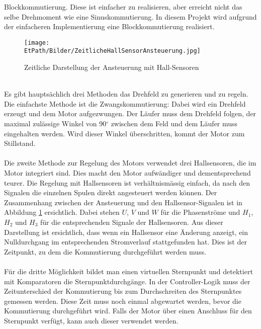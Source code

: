         Blockkommutierung. Diese ist einfacher zu realisieren, aber erreicht 
        nicht das selbe Drehmoment wie eine Sinuskommutierung. In diesem 
        Projekt wird aufgrund der einfacheren Implementierung eine 
        Blockkommutierung realisiert. \\
    \ifSTANDALONE
        \begin{figure}[h!]
            \texttt{[image: \\EtPath/Bilder/ZeitlicheHallSensorAnsteuerung.jpg]}
            \centering
            \caption[Zeitliche Darstellung der Ansteuerung mit Hall-Sensoren]
            {Zeitliche Darstellung der Ansteuerung mit Hall-Sensoren \cite{AppNote:BrushlessuC}}
            \label{abb:ZeitlicheAnsteuerungBrushlessMotor}
        \end{figure}
    \fi
        \\
        Es gibt hauptsächlich drei Methoden das Drehfeld zu generieren und zu 
        regeln. Die einfachste Methode ist die Zwangskommutierung: 
        Dabei wird ein Drehfeld erzeugt und dem Motor aufgezwungen. Der Läufer 
        muss dem Drehfeld folgen, der maximal zulässige Winkel von 90$^\circ$
        zwischen dem Feld und dem Läufer muss eingehalten werden. Wird dieser 
        Winkel überschritten, kommt der Motor zum Stillstand.\\
        \\
        Die zweite Methode zur Regelung des Motors verwendet drei Hallsensoren, die im 
        Motor integriert sind. Dies macht den Motor aufwändiger und 
        dementsprechend teurer. Die Regelung mit Hallsensoren ist 
        verhältnismässig einfach, da nach den Signalen die einzelnen Spulen 
        direkt angesteuert werden können. Der Zusammenhang zwischen der 
        Ansteuerung und den Hallsensor-Signalen ist in Abbildung 
        \ref{abb:ZeitlicheAnsteuerungBrushlessMotor} ersichtlich. Dabei stehen 
        $U$, $V$ und $W$ für die Phasenströme und $H_1$, $H_2$ und $H_3$ für die 
        entsprechenden Signale der Hallsensoren. Aus dieser Darstellung ist 
        ersichtlich, dass wenn ein Hallsensor eine Änderung anzeigt, 
        ein Nulldurchgang im entsprechenden Stromverlauf stattgefunden hat. 
        Dies ist der Zeitpunkt, zu dem die Kommutierung durchgeführt werden 
        muss.\\
        \\
        Für die dritte Möglichkeit bildet man einen virtuellen Sternpunkt 
        und detektiert mit Komparatoren die Sternpunktdurchgänge. 
        In der Controller-Logik muss der Zeitunterschied der Kommutierung 
        bis zum Durchschreiten des Sternpunktes gemessen werden. Diese Zeit 
        muss noch einmal abgewartet werden, bevor die Kommutierung durchgeführt 
        wird. Falls der Motor über einen Anschluss für den Sternpunkt 
        verfügt, kann auch dieser verwendet werden. 
\ifSTANDALONE
